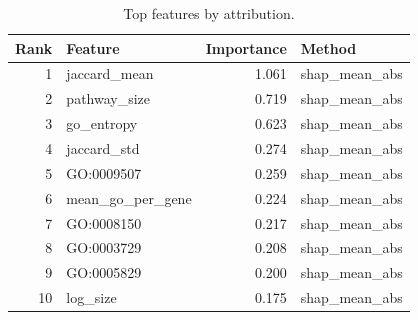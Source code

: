 \begin{table}[htbp]
\centering
\caption{Top features by attribution.}
\label{tab:top_features_recomputed}
\begin{tabular}{rlrl}
\toprule
Rank & Feature & Importance & Method \\
\midrule
1 & jaccard\_mean & 1.061 & shap\_mean\_abs \\
2 & pathway\_size & 0.719 & shap\_mean\_abs \\
3 & go\_entropy & 0.623 & shap\_mean\_abs \\
4 & jaccard\_std & 0.274 & shap\_mean\_abs \\
5 & GO:0009507 & 0.259 & shap\_mean\_abs \\
6 & mean\_go\_per\_gene & 0.224 & shap\_mean\_abs \\
7 & GO:0008150 & 0.217 & shap\_mean\_abs \\
8 & GO:0003729 & 0.208 & shap\_mean\_abs \\
9 & GO:0005829 & 0.200 & shap\_mean\_abs \\
10 & log\_size & 0.175 & shap\_mean\_abs \\
\bottomrule
\end{tabular}

\end{table}
